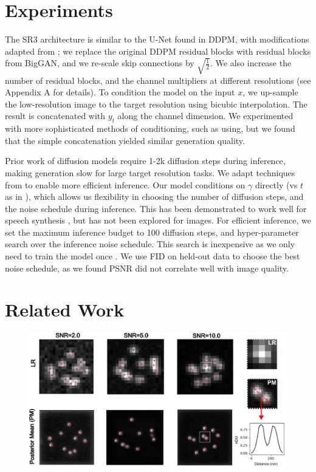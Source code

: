 \documentclass{article}
\begin{document}
\section{Experiments}

The SR3 architecture is similar to the U-Net found in DDPM, with modifications adapted from \cite{ref51}; we replace the original DDPM residual blocks with residual blocks from BigGAN, and we re-scale skip connections by $\sqrt{\frac{1}{2}}$. We also increase the number of residual blocks, and the channel multipliers at different resolutions (see Appendix A for details). To condition the model on the input $x$, we up-sample the low-resolution image to the target resolution using bicubic interpolation. The result is concatenated with $y_t$ along the channel dimension. We experimented with more sophisticated methods of conditioning, such as using, but we found that the simple concatenation yielded similar generation quality.


Prior work of diffusion models \cite{ref17, ref51} require 1-2k diffusion steps during inference, making generation slow for large target resolution tasks. We adapt techniques from \cite{ref6} to enable more efficient inference. Our model conditions on $\gamma$ directly (vs $t$ as in \cite{ref17}), which allows us flexibility in choosing the number of diffusion steps, and the noise schedule during inference. This has been demonstrated to work well for speech synthesis \cite{ref6}, but has not been explored for images. For efficient inference, we set the maximum inference budget to 100 diffusion steps, and hyper-parameter search over the inference noise schedule. This search is inexpensive as we only need to train the model once \cite{ref6}. We use FID on held-out data to choose the best noise schedule, as we found PSNR did not correlate well with image quality.


\section{Related Work}


\begin{figure}
\includegraphics[scale=0.6]{Samples.png}
\end{figure}
\end{document}
